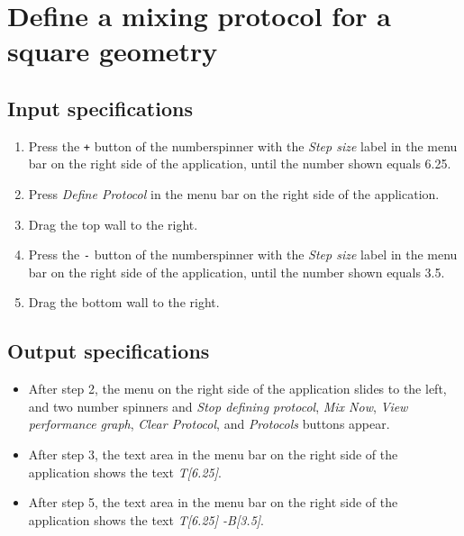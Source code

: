 \section{Define a mixing protocol for a square geometry}

\subsection*{Input specifications}
\begin{enumerate}
\item Press the \texttt{+} button of the numberspinner with the \emph{Step size} label in the menu bar on the right side of the application, until the number shown equals 6.25.
\item Press \emph{Define Protocol} in the menu bar on the right side of the application.
\item Drag the top wall to the right.
\item Press the \texttt{-} button of the numberspinner with the \emph{Step size} label in the menu bar on the right side of the application, until the number shown equals 3.5.
\item Drag the bottom wall to the right.
\end{enumerate}

\subsection*{Output specifications}
\begin{itemize}
\item After step 2, the menu on the right side of the application slides to the left, and two number spinners and \emph{Stop defining protocol}, \emph{Mix Now}, \emph{View performance graph}, \emph{Clear Protocol}, and \emph{Protocols} buttons appear.
\item After step 3, the text area in the menu bar on the right side of the application shows the text \emph{T[6.25]}.
\item After step 5, the text area in the menu bar on the right side of the application shows the text \emph{T[6.25] -B[3.5]}.
\end{itemize}